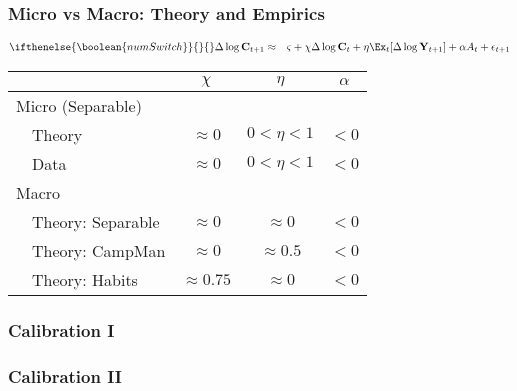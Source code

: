 \documentclass{beamer}\usepackage{dcolumn}
\providecommand{\ifnumSw}{\ifthenelse{\boolean{numSwitch}}{}{\nonumber}}
\begin{document}
\begin{frame}
\frametitle{Micro vs Macro: Theory and Empirics}
\begin{eqnarray}
\ifnumSw\Delta \log \mathbf{C}_{t+1} & \approx & \varsigma+\chi \Delta \log \mathbf{C}_{t}+\eta \Ex_{t}[\Delta \log \mathbf{Y}_{t+1}]+\alpha A_{t}+\epsilon_{t+1} \nonumber
\end{eqnarray}

\begin{center}
\begin{tabular}{llccc}
\toprule
        &        & $\chi$       & $\eta$          & $\alpha$
\\ \midrule \multicolumn{2}{l}{Micro (Separable)}
\\    & Theory                 & $\approx 0  $      & $0 < \eta < 1 $ & $< 0$
\\        & Data                   & $\approx 0  $      & $0 < \eta < 1 $ & $< 0$
\\ \midrule \multicolumn{2}{l}{Macro}
\\ & Theory: Separable          & $\approx 0   $     & $\approx 0$           & $< 0$
\\ & Theory: CampMan            & $\approx 0   $     & $\approx 0.5$           & $< 0$
\\ & Theory: Habits             & $\approx 0.75$     & $\approx 0$           & $< 0$
\\ \bottomrule
\end{tabular}
\end{center}
\end{frame}





\begin{frame}
\frametitle{Calibration I}
\small



\end{frame}


\begin{frame}
\frametitle{Calibration II}
\small



\end{frame}
\end{document}
